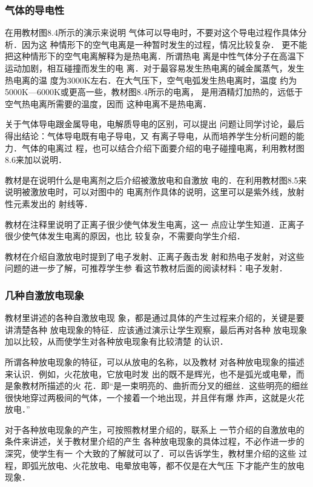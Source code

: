 \subsubsection{气体的导电性}

在用教材图8.4所示的演示来说明
气体可以导电时，不要对这个导电过程作具体分析．因为这
种情形下的空气电离是一种暂时发生的过程，情况比较复杂．
更不能把这种情形下的空气电离解释为是热电离．所谓热电
离是中性气体分子在高温下运动加剧，相互碰撞而发生的电
离．对于最容易发生热电离的碱金属蒸气，发生热电离的温
度为3000K左右．在大气压下，空气电弧发生热电离时，温度
约为5000K—6000K或更高一些，教材图8.4所示的电离，
是用酒精灯加热的，远低于空气热电离所需要的温度，因而
这种电离不是热电离．

关于气体导电跟金属导电，电解质导电的区别，可以提出
问题让同学讨论，最后得出结论：气体导电既有电子导电，又
有离子导电，从而培养学生分析问题的能力．气体的电离过
程，也可以结合介绍下面要介绍的电子碰撞电离，利用教材图
8.6来加以说明．

教材是在说明什么是电离剂之后介绍被激放电和自激放
电的．在利用教材图8.5来说明被激放电时，可以对图中的
电离剂作具体的说明，这里可以是紫外线，放射性元素发出的
射线等．

教材在注释里说明了正离子很少使气体发生电离，这一
点应让学生知道．正离子很少使气体发生电离的原因，也比
较复杂，不需要向学生介绍．

教材在介绍自激放电时提到了电子发射、正离子轰击发
射和热电子发射，对这些问题的进一步了解，可推荐学生参
看这节教材后面的阅读材料：电子发射．

\subsubsection{几种自激放电现象}

教材里讲述的各种自激放电现
象，都是通过具体的产生过程来介绍的，关键是要讲清楚各种
放电现象的特征．应该通过演示让学生观察，最后再对各种
放电现象加以比较，从而使学生对各种放电现象有比较清楚
的认识．

所谓各种放电现象的特征，可以从放电的名称，以及教材
对各种放电现象的描述来认识．例如，火花放电，它放电时发
出的既不是辉光，也不是弧光或电晕，而是象教材所描述的火
花．即“是一束明亮的、曲折而分叉的细丝．这些明亮的细丝
很快地穿过两极间的气体，一个接着一个地出现，并且伴有爆
炸声，这就是火花放电．”

对于各种放电现象的产生，可按照教材里介绍的，联系上
一节介绍的自激放电的条件来讲述，关于教材里介绍的产生
各种放电现象的具体过程，不必作进一步的深究，使学生有一
个大致的了解就可以了．可以告诉学生，教材里介绍的这些
过程，即弧光放电、火花放电、电晕放电等，都不仅是在大气压
下才能产生的放电现象．

